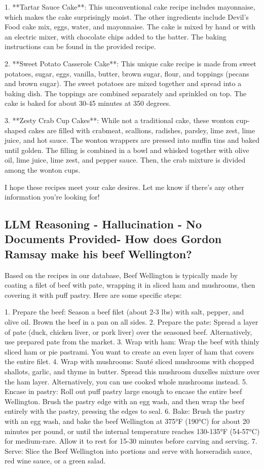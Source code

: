 \documentclass[a4paper,11pt]{article}
\begin{document}
1. **Tartar Sauce Cake**: This unconventional cake recipe includes mayonnaise, which makes the cake surprisingly moist. The other ingredients include Devil's Food cake mix, eggs, water, and mayonnaise. The cake is mixed by hand or with an electric mixer, with chocolate chips added to the batter. The baking instructions can be found in the provided recipe.

2. **Sweet Potato Casserole Cake**: This unique cake recipe is made from sweet potatoes, sugar, eggs, vanilla, butter, brown sugar, flour, and toppings (pecans and brown sugar). The sweet potatoes are mixed together and spread into a baking dish. The toppings are combined separately and sprinkled on top. The cake is baked for about 30-45 minutes at 350 degrees.

3. **Zesty Crab Cup Cakes**: While not a traditional cake, these wonton cup-shaped cakes are filled with crabmeat, scallions, radishes, parsley, lime zest, lime juice, and hot sauce. The wonton wrappers are pressed into muffin tins and baked until golden. The filling is combined in a bowl and whisked together with olive oil, lime juice, lime zest, and pepper sauce. Then, the crab mixture is divided among the wonton cups.

I hope these recipes meet your cake desires. Let me know if there's any other information you're looking for!

\subsection{LLM Reasoning - Hallucination - No Documents Provided- How does Gordon Ramsay make his beef Wellington?}
Based on the recipes in our database, Beef Wellington is typically made by coating a filet of beef with pate, wrapping it in sliced ham and mushrooms, then covering it with puff pastry. Here are some specific steps:

1. Prepare the beef: Season a beef filet (about 2-3 lbs) with salt, pepper, and olive oil. Brown the beef in a pan on all sides.
2. Prepare the pate: Spread a layer of pate (duck, chicken liver, or pork liver) over the seasoned beef. Alternatively, use prepared pate from the market.
3. Wrap with ham: Wrap the beef with thinly sliced ham or pie pastrami. You want to create an even layer of ham that covers the entire filet.
4. Wrap with mushrooms: Sauté sliced mushrooms with chopped shallots, garlic, and thyme in butter. Spread this mushroom duxelles mixture over the ham layer. Alternatively, you can use cooked whole mushrooms instead.
5. Encase in pastry: Roll out puff pastry large enough to encase the entire beef Wellington. Brush the pastry edge with an egg wash, and then wrap the beef entirely with the pastry, pressing the edges to seal.
6. Bake: Brush the pastry with an egg wash, and bake the beef Wellington at 375°F (190°C) for about 20 minutes per pound, or until the internal temperature reaches 130-135°F (54-57°C) for medium-rare. Allow it to rest for 15-30 minutes before carving and serving.
7. Serve: Slice the Beef Wellington into portions and serve with horseradish sauce, red wine sauce, or a green salad.
\end{document}

